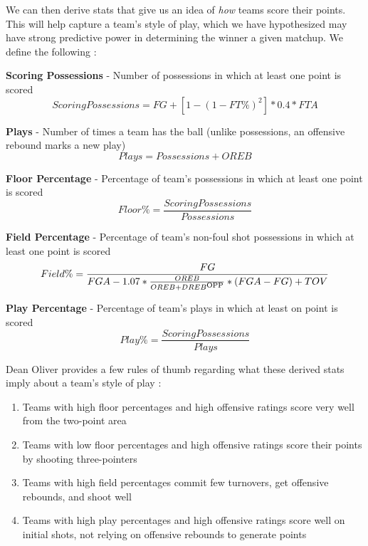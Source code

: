 \documentclass[]{article}
\def\SP#1{\textsuperscript{{#1}}}
\begin{document}
We can then derive stats that give us an idea of \textit{how} teams score their points. This will help capture a team's style of play, which we have hypothesized may have strong predictive power in determining the winner a given matchup. We define the following \cite{basketballonpaper}:

\textbf{Scoring Possessions} - Number of possessions in which at least one point is scored
\begin{equation}
	Scoring Possessions = FG + \left[1 - (1- FT\%)^2\right] * 0.4*FTA
\end{equation}

\textbf{Plays} - Number of times a team has the ball (unlike possessions, an offensive rebound marks a new play)
\begin{equation}
	Plays = Possessions + OREB	
\end{equation}

\textbf{Floor Percentage} - Percentage of team's possessions in which at least one point is scored
\begin{equation}
	Floor \% = \frac{Scoring Possessions}{Possessions}
\end{equation}

\textbf{Field Percentage} - Percentage of team's non-foul shot possessions in which at least one point is scored
\begin{equation}
	Field \% = \frac{FG}{FGA - 1.07*\frac{OREB}{OREB+DREB\SP{OPP}}*(FGA-FG)+TOV}
\end{equation}

\textbf{Play Percentage} - Percentage of team's plays in which at least on point is scored
\begin{equation}
	Play\% = \frac{Scoring Possessions}{Plays}
\end{equation}

 Dean Oliver provides a few rules of thumb regarding what these derived stats imply about a team's style of play \cite{basketballonpaper}:

\begin{enumerate}
	\item Teams with high floor percentages and high offensive ratings score very well from the two-point area
	\item Teams with low floor percentages and high offensive ratings score their points by shooting three-pointers
	\item Teams with high field percentages commit few turnovers, get offensive rebounds, and shoot well
	\item Teams with high play percentages and high offensive ratings score well on initial shots, not relying on offensive rebounds to generate points
\end{enumerate}
\end{document}
